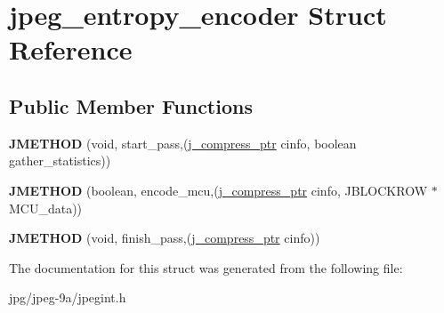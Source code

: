 \hypertarget{structjpeg__entropy__encoder}{\section{jpeg\+\_\+entropy\+\_\+encoder Struct Reference}
\label{structjpeg__entropy__encoder}
}
\subsection*{Public Member Functions}
\begin{DoxyCompactItemize}
\item 
\hypertarget{structjpeg__entropy__encoder_aa42cc97f950746e53857b958e00519dd}{{\bfseries J\+M\+E\+T\+H\+O\+D} (void, start\+\_\+pass,(\hyperlink{structjpeg__compress__struct}{j\+\_\+compress\+\_\+ptr} cinfo, boolean gather\+\_\+statistics))}\label{structjpeg__entropy__encoder_aa42cc97f950746e53857b958e00519dd}

\item 
\hypertarget{structjpeg__entropy__encoder_a6852c01b9a63cceaae5f1d0e4ef1185a}{{\bfseries J\+M\+E\+T\+H\+O\+D} (boolean, encode\+\_\+mcu,(\hyperlink{structjpeg__compress__struct}{j\+\_\+compress\+\_\+ptr} cinfo, J\+B\+L\+O\+C\+K\+R\+O\+W $\ast$M\+C\+U\+\_\+data))}\label{structjpeg__entropy__encoder_a6852c01b9a63cceaae5f1d0e4ef1185a}

\item 
\hypertarget{structjpeg__entropy__encoder_a349e641fd2289448e8169b8aa8edefa5}{{\bfseries J\+M\+E\+T\+H\+O\+D} (void, finish\+\_\+pass,(\hyperlink{structjpeg__compress__struct}{j\+\_\+compress\+\_\+ptr} cinfo))}\label{structjpeg__entropy__encoder_a349e641fd2289448e8169b8aa8edefa5}

\end{DoxyCompactItemize}


The documentation for this struct was generated from the following file\+:\begin{DoxyCompactItemize}
\item 
jpg/jpeg-\/9a/jpegint.\+h\end{DoxyCompactItemize}
